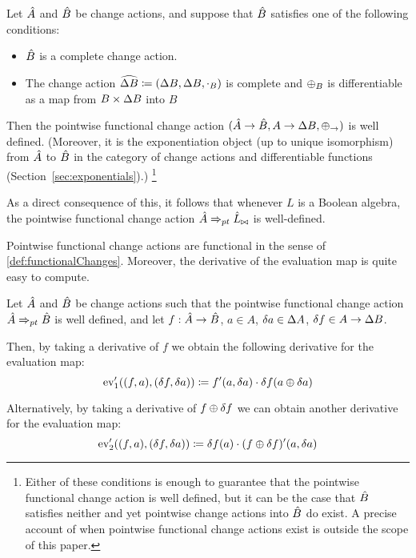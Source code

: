 \begin{thm}
  Let $\hat{A}$ and $\hat{B}$ be change actions, and suppose that $\hat{B}$ satisfies one of the
  following conditions:
  \begin{itemize}
    \item $\hat{B}$ is a complete change action.
    \item The change action $\widehat {\Delta B} \coloneqq (\Delta B, \Delta B, \cdot_B)$ is 
      complete and 
      $\oplus_B$ is differentiable as a map from $B \times \Delta B$ into $B$
  \end{itemize}
  Then the pointwise functional change action 
  $(\hat{A} \rightarrow \hat{B}, A \rightarrow \Delta B, \oplus_\rightarrow)$ is well defined. 
  (Moreover, it is the exponentiation object (up to unique isomorphism) from $\hat{A}$ to $\hat{B}$ in the category of change actions and differentiable functions (Section~\ref{sec:exponentials}).)
  \footnote{
    Either of these conditions is enough to guarantee that the pointwise functional change action
    is well defined, but it can be the case that $\hat{B}$ satisfies neither and yet pointwise
    change actions into $\hat{B}$ do exist. A precise account of when pointwise functional change
    actions exist is outside the scope of this paper.
  }
\end{thm}
As a direct consequence of this, it follows that whenever $L$ is a Boolean algebra, the
pointwise functional change action $\hat{A} \Rightarrow_{pt} \hat{L}_{\bowtie}$ is well-defined.

Pointwise functional change actions are functional in the sense of \cref{def:functionalChanges}. 
Moreover, the derivative of the evaluation map is quite easy to compute. 
\begin{prop}
\label{prop:evDerivatives}
  Let $\hat{A}$ and $\hat{B}$ be change actions such that the pointwise functional change action
  $\hat{A} \Rightarrow_{pt} \hat{B}$ is well defined, and let
  $f: \hat{A} \rightarrow \hat{B}$,
  $a \in A$, $\delta a \in \Delta A$,
  $\delta f \in A \rightarrow \Delta B$.

  Then, by taking a derivative of $f$ we obtain the following derivative for the evaluation map:
  \begin{displaymath}
    \operatorname{ev}'_1((f, a), (\delta f, \delta a)) 
    \coloneqq f'(a, \delta a) \cdot \delta f(a \oplus \delta a)
  \end{displaymath}

  Alternatively, by taking a derivative of $f \oplus \delta f$ we can obtain another derivative
  for the evaluation map:
  \begin{displaymath}
    \operatorname{ev}'_2((f, a), (\delta f, \delta a)) 
    \coloneqq \delta f(a) \cdot (f \oplus \delta f)'(a, \delta a)
  \end{displaymath}
\end{prop}

